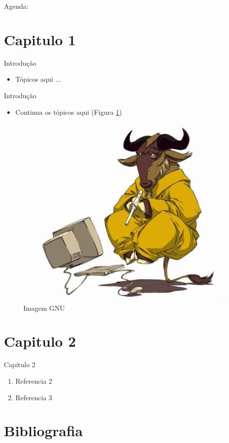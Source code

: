 
\begin{frame}[t,plain]
\titlepage
\end{frame}

\begin{frame}
	Agenda:
	\tableofcontents
\end{frame}

\section{Capitulo 1} %
\begin{frame}[t]{Introdução} %
\begin{itemize}
	\item Tópicos aqui ... \cite{da_silva_understanding_2010}
\end{itemize}
\end{frame}

\begin{frame}[t]{Introdução} %
	\begin{itemize}
		\item Continua os tópicos aqui (Figura \ref{fig:nla})
	\end{itemize}
	\begin{figure}
		\includegraphics[scale=0.25]{gnu.png}
		\caption{Imagem GNU}
		\label{fig:nla}
	\end{figure}
\end{frame}

\section{Capitulo 2} 
\begin{frame}[t]{Capitulo 2} %
	\begin{enumerate}
		\item Referencia 2 \cite{filho}
                \item Referencia 3 \cite{amadeu}
	\end{enumerate}
\end{frame}

\section{Bibliografia}
\begin{frame}

\tiny{} %
\end{frame}

